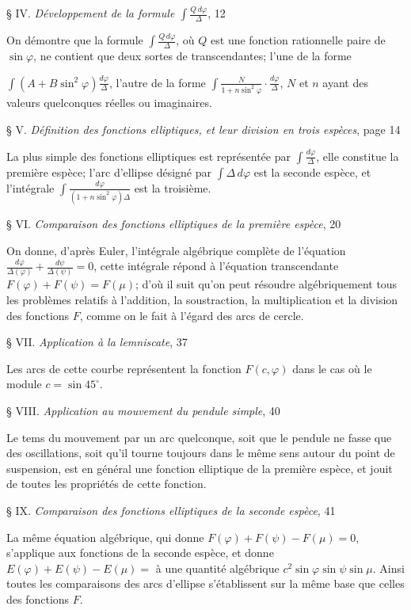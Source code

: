 \documentclass{article}
\begin{document}
§ IV. \emph{Développement de la formule $\displaystyle\int\frac{Q\,d\varphi}{\Delta}$}, 12

On démontre que la formule $\displaystyle\int\frac{Q\,d\varphi}{\Delta}$, où $Q$ est une fonction rationnelle paire de $\sin\varphi$, ne contient que deux sortes de transcendantes; l'une de la forme

$\displaystyle\int(A+B\sin^{2}\varphi)\frac{d\varphi}{\Delta}$, l'autre de la forme $\displaystyle\int\frac{N}{1+n\sin^{2}\varphi}\cdot\frac{d\varphi}{\Delta}$, $N$ et $n$ ayant des valeurs quelconques réelles ou imaginaires.

§ V. \emph{Définition des fonctions elliptiques, et leur division en trois espèces}, page 14

La plus simple des fonctions elliptiques est représentée par $\displaystyle\int\frac{d\varphi}{\Delta}$, elle constitue la première espèce; l'arc d'ellipse désigné par $\displaystyle\int\Delta\,d\varphi$ est la seconde espèce, et l'intégrale $\displaystyle\int\frac{d\varphi}{(1+n\sin^{2}\varphi)\Delta}$ est la troisième.

§ VI. \emph{Comparaison des fonctions elliptiques de la première espèce}, 20

On donne, d'après Euler, l'intégrale algébrique complète de l'équation $\frac{d\varphi}{\Delta(\varphi)}+\frac{d\psi}{\Delta(\psi)}=0$, cette intégrale répond à l'équation transcendante $F(\varphi)+F(\psi)=F(\mu)$; d'où il suit qu'on peut résoudre algébriquement tous les problèmes relatifs à l'addition, la soustraction, la multiplication et la division des fonctions $F$, comme on le fait à l'égard des arcs de cercle.

§ VII. \emph{Application à la lemniscate}, 37

Les arcs de cette courbe représentent la fonction $F(c,\varphi)$ dans le cas où le module $c=\sin45^{\circ}$.

§ VIII. \emph{Application au mouvement du pendule simple}, 40

Le tems du mouvement par un arc quelconque, soit que le pendule ne fasse que des oscillations, soit qu'il tourne toujours dans le même sens autour du point de suspension, est en général une fonction elliptique de la première espèce, et jouit de toutes les propriétés de cette fonction.

§ IX. \emph{Comparaison des fonctions elliptiques de la seconde espèce}, 41

La même équation algébrique, qui donne $F(\varphi)+F(\psi)-F(\mu)=0$, s'applique aux fonctions de la seconde espèce, et donne $E(\varphi)+E(\psi)-E(\mu)=$ à une quantité algébrique $c^{2}\sin\varphi\sin\psi\sin\mu$. Ainsi toutes les comparaisons des arcs d'ellipse s'établissent sur la même base que celles des fonctions $F$.
\end{document}
